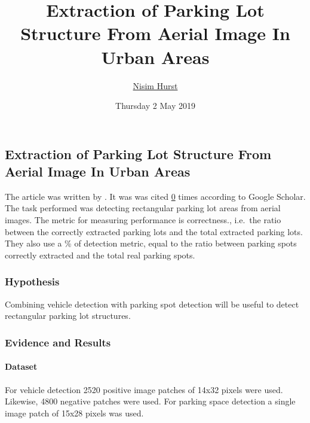 \documentclass[]{article}
\title{Extraction of Parking Lot Structure From Aerial Image In Urban Areas}
\author{\href{mailto:langheran@gmail.com}{Nisim Hurst}}
\date{Thursday 2 May 2019}
\let\oldparagraph\paragraph
\renewcommand{\paragraph}[1]{\oldparagraph{#1}\mbox{}}
\begin{document}
\maketitle

\label{toc}

\hypertarget{extraction-of-parking-lot-structure-from-aerial-image-in-urban-areas}{%
\subsection{Extraction of Parking Lot Structure From Aerial Image In Urban Areas}\label{extraction-of-parking-lot-structure-from-aerial-image-in-urban-areas}}

The article was written by \autocite{koutaki2016extraction}. It was was cited \href{https://scholar.google.com/scholar?q=Extraction\%20of\%20Parking\%20Lot\%20Structure\%20From\%20Aerial\%20Image\%20In\%20Urban\%20Areas\%20koutaki\&hl=en\&as_sdt=0\&as_vis=1\&oi=scholart\&sa=X\&ved=0ahUKEwiN67qBocbWAhXrjVQKHcX0BYwQgQMIMDAA}{0} times according to Google Scholar. The task performed was detecting rectangular parking lot areas from aerial images. The metric for measuring performance is correctness., i.e.~the ratio between the correctly extracted parking lots and the total extracted parking lots. They also use a \% of detection metric, equal to the ratio between parking spots correctly extracted and the total real parking spots.

\hypertarget{hypothesis}{%
\subsubsection{Hypothesis}\label{hypothesis}}

Combining vehicle detection with parking spot detection will be useful to detect rectangular parking lot structures.

\hypertarget{evidence-and-results}{%
\subsubsection{Evidence and Results}\label{evidence-and-results}}

\hypertarget{dataset}{%
\paragraph{Dataset}\label{dataset}}

For vehicle detection 2520 positive image patches of 14x32 pixels were used. Likewise, 4800 negative patches were used. For parking space detection a single image patch of 15x28 pixels was used.
\end{document}
